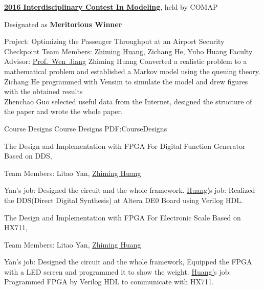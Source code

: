\documentclass[letterpaper,MMMyyyy,nonstopmode]{simpleresumecv}
\begin{document}
\begin{Body}
\Entry
\href{http://www.comap.com/undergraduate/contests/}
{\textbf{2016 Interdisciplinary Contest In Modeling}},
held by COMAP

\Gap
\BulletItem
Designated as \textbf{Meritorious Winner}
\hfill
\begin{Detail}
\SubBulletItem
Project:
Optimizing the Passenger Throughput at an Airport Security Checkpoint
\SubBulletItem
Team Members:
\underline{Zhiming Huang}, Zichang He, Yubo Huang
\SubBulletItem
Faculty Advisor:
\href{http://teacher.nwpu.edu.cn/jiangwen.html}
{Prof.~Wen~Jiang}
\SubBulletItem
Zhiming Huang Converted a realistic problem to a mathematical problem and established a Markov model using the queuing theory.\\
Zichang He programmed with Vensim to simulate the model and drew figures with the obtained results\\
Zhenchao Guo selected useful data from the Internet, designed the structure of the paper and wrote the whole paper.
\end{Detail}




\Section
{Course \newline Designs}
{Course Designs}
{PDF:CourseDesigns}

\Entry
The Design and Implementation with FPGA For Digital Function Generator Based on DDS,

\Gap
\BulletItem
Team Members: Litao Yan, \underline{Zhiming Huang}
\hfill
{}
\begin{Detail}
\SubBulletItem
Yan’s job: Designed the circuit and the whole framework.
\SubBulletItem
\underline{Huang'}s job: Realized the DDS(Direct Digital Synthesis) at Altera DE0 Board using Verilog HDL.
\end{Detail}
\BigGap
\Entry
The Design and Implementation with FPGA For Electronic Scale Based on HX711,

\Gap
\BulletItem
Team Members: Litao Yan, \underline{Zhiming Huang}
\hfill
{}
\begin{Detail}
\SubBulletItem
Yan’s job: Designed the circuit and the whole framework, Equipped the FPGA with a LED screen and programmed it to show the weight.
\SubBulletItem
\underline{Huang'}s job: Programmed FPGA by Verilog HDL to communicate with HX711.
\end{Detail}



\end{Body}
\end{document}
